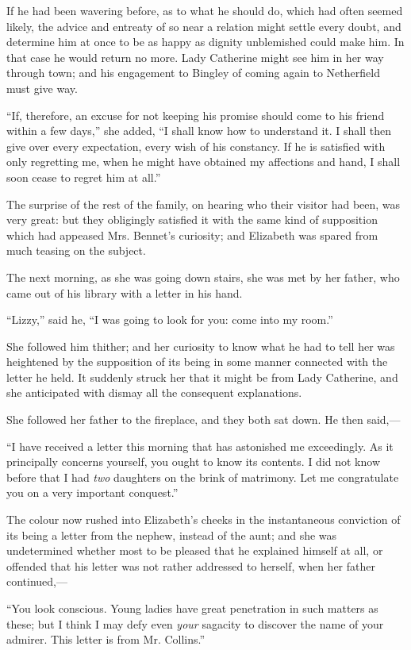\documentclass[12pt,openright]{book}
\begin{document}
If he had been wavering before, as to what he should do, which had often seemed likely, the advice and entreaty of so near a relation might settle every doubt, and determine him at once to be as happy as dignity unblemished could make him. In that case he would return no more. Lady Catherine might see him in her way through town; and his engagement to Bingley of coming again to Netherfield must give way.

“If, therefore, an excuse for not keeping his promise should come to his friend within a few days,” she added, “I shall know how to understand it. I shall then give over every expectation, every wish of his constancy. If he is satisfied with only regretting me, when he might have obtained my affections and hand, I shall soon cease to regret him at all.”

The surprise of the rest of the family, on hearing who their visitor had been, was very great: but they obligingly satisfied it with the same kind of supposition which had appeased Mrs. Bennet’s curiosity; and Elizabeth was spared from much teasing on the subject.

The next morning, as she was going down stairs, she was met by her father, who came out of his library with a letter in his hand.

“Lizzy,” said he, “I was going to look for you: come into my room.”

She followed him thither; and her curiosity to know what he had to tell her was heightened by the supposition of its being in some manner connected with the letter he held. It suddenly struck her that it might be from Lady Catherine, and she anticipated with dismay all the consequent explanations.

She followed her father to the fireplace, and they both sat down. He then said,—

“I have received a letter this morning that has astonished me exceedingly. As it principally concerns yourself, you ought to know its contents. I did not know before that I had \textit{two} daughters on the brink of matrimony. Let me congratulate you on a very important conquest.”

The colour now rushed into Elizabeth’s cheeks in the instantaneous conviction of its being a letter from the nephew, instead of the aunt; and she was undetermined whether most to be pleased that he explained himself at all, or offended that his letter was not rather addressed to herself, when her father continued,—

“You look conscious. Young ladies have great penetration in such matters as these; but I think I may defy even \textit{your} sagacity to discover the name of your admirer. This letter is from Mr. Collins.”
\end{document}
